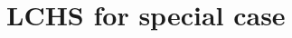 \documentclass{article}
\newcommand{\dd}{\mathrm{d}}
\begin{document}




\section{LCHS for special case}
\end{document}
